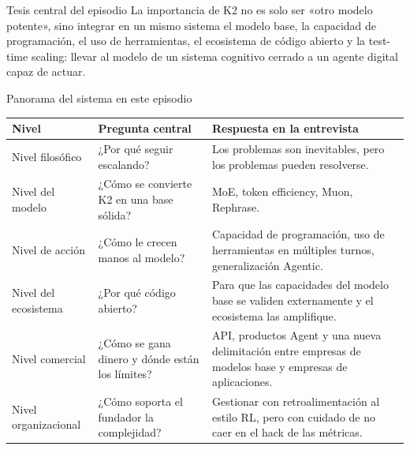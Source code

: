 \begin{importantbox}{Tesis central del episodio}
La importancia de K2 no es solo ser «otro modelo potente», sino integrar en un mismo sistema el modelo base, la capacidad de programación, el uso de herramientas, el ecosistema de código abierto y la test-time scaling: llevar al modelo de un sistema cognitivo cerrado a un agente digital capaz de actuar.
\end{importantbox}

\begin{knowledgebox}{Panorama del sistema en este episodio}
\begin{tabularx}{\textwidth}{p{}p{}X}
\toprule
Nivel & Pregunta central & Respuesta en la entrevista \\
\midrule
Nivel filosófico & ¿Por qué seguir escalando? & Los problemas son inevitables, pero los problemas pueden resolverse. \\
Nivel del modelo & ¿Cómo se convierte K2 en una base sólida? & MoE, token efficiency, Muon, Rephrase. \\
Nivel de acción & ¿Cómo le crecen manos al modelo? & Capacidad de programación, uso de herramientas en múltiples turnos, generalización Agentic. \\
Nivel del ecosistema & ¿Por qué código abierto? & Para que las capacidades del modelo base se validen externamente y el ecosistema las amplifique. \\
Nivel comercial & ¿Cómo se gana dinero y dónde están los límites? & API, productos Agent y una nueva delimitación entre empresas de modelos base y empresas de aplicaciones. \\
Nivel organizacional & ¿Cómo soporta el fundador la complejidad? & Gestionar con retroalimentación al estilo RL, pero con cuidado de no caer en el hack de las métricas. \\
\bottomrule
\end{tabularx}
\end{knowledgebox}

